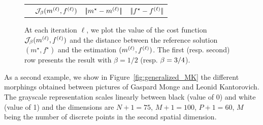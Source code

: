 \begin{figure}[!ht]
\begin{center}
\begin{tabular}{@{}l@{}c@{}c@{}c@{}}
& $\mathcal{J}_\beta( {m}^{(\ell)},{f}^{(\ell)} )$ &  $|\!| m^\star-{m}^{(\ell)} |\!|$ & 
$|\!| f^\star-{f}^{(\ell)} |\!|$ 
\end{tabular}
\end{center}
\caption{\label{fig:evol_bump_beta} At each iteration $\ell$, we plot the value of the cost function $\mathcal{J}_\beta({m}^{(\ell)},{f}^{(\ell)})$ and the distance between the reference solution $(m^\star,f^\star)$ and the estimation $({m}^{(\ell)},{f}^{(\ell)})$. The first (resp. second) row presents the result with $\beta=1/2$ (resp. $\beta=3/4$).}
\end{figure}

As a second example, we show in Figure~\ref{fig:generalized_MK} the different morphings obtained between pictures of Gaspard Monge and Leonid Kantorovich. The grayscale representation scales linearly between black (value of 0) and white (value of 1)  and the dimensions are $N+1=75$, $M+1=100$, $P+1=60$, $M$ being the number of discrete points in the second spatial dimension.

\newcommand{\myfigMonge}[1]{\texttt{[image: images/MK/MK\_beta\#1]}}

\renewcommand{\sidecap}[1]{ {\begin{sideways}\parbox{1.9cm}{\centering #1}\end{sideways}} }

